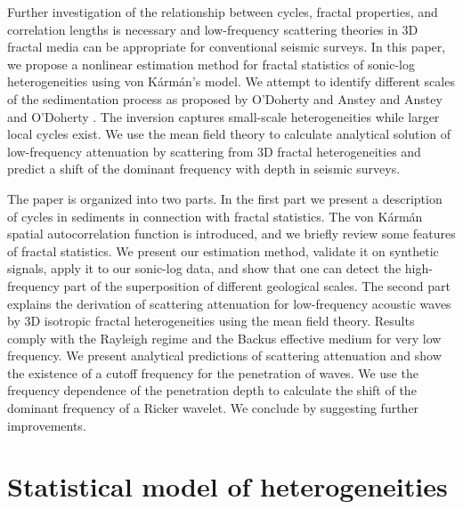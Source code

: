 Further investigation of the relationship between cycles, fractal properties,
and correlation lengths is necessary and low-frequency 
scattering theories in 3D fractal media can be appropriate 
for conventional seismic surveys.
In this paper, we propose a nonlinear estimation method for fractal statistics 
of sonic-log heterogeneities using von K\'arm\'an's model.
We attempt to identify different scales of the sedimentation process
as proposed by O'Doherty and Anstey  and Anstey and O'Doherty .
The inversion captures small-scale heterogeneities while larger local cycles exist.
We use the mean field theory to calculate analytical solution of low-frequency 
attenuation by scattering from 3D fractal heterogeneities
and predict a shift of the dominant frequency with depth in seismic surveys.

The paper is organized into two parts.
In the first part we present a description of cycles in sediments
in connection with fractal statistics.
The von K\'arm\'an spatial autocorrelation function is introduced,
and we briefly review some features of fractal statistics.
We present our estimation method, validate it on synthetic signals,
apply it to our sonic-log data, and show that one can detect the high-frequency part
of the superposition of different geological scales.
The second part explains the derivation of scattering attenuation
for low-frequency acoustic waves by 3D isotropic fractal heterogeneities using the mean field theory.
Results comply with the Rayleigh regime
and the Backus effective medium for very low frequency.
We present analytical predictions of scattering attenuation and show the existence of
a cutoff frequency for the penetration of waves.
We use the frequency dependence of the penetration depth
to calculate the shift of the dominant frequency of a Ricker wavelet.
We conclude by suggesting further improvements.


\section{Statistical model of heterogeneities}


